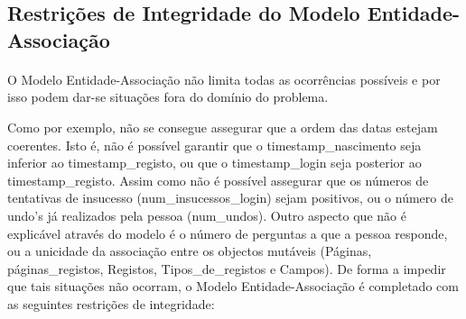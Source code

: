 \documentclass[11pt,a4paper]{article}
\begin{document}
\newpage

\subsection{Restri\c{c}\~oes de Integridade do Modelo Entidade-Associa\c{c}\~ao}

\paragraph{}

O Modelo Entidade-Associação não limita todas as ocorrências possíveis e por isso podem dar-se situações fora do domínio do problema.

Como por exemplo, não se consegue assegurar que a ordem das datas estejam coerentes. Isto é, não é possível garantir que o timestamp\_nascimento seja inferior ao timestamp\_registo, ou que o timestamp\_login seja posterior ao timestamp\_registo.
Assim como não é possível assegurar que os números de tentativas de insucesso (num\_insucessos\_login) sejam positivos, ou o número de undo’s já realizados pela pessoa (num\_undos).
Outro aspecto que não é explicável através do modelo é o número de perguntas a que a pessoa responde, ou a unicidade da associação entre os objectos mutáveis (Páginas, páginas\_registos, Registos, Tipos\_de\_registos e Campos).
De forma a impedir que tais situações não ocorram, o Modelo Entidade-Associação é completado com as seguintes restrições de integridade:
\\
\end{document}
